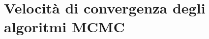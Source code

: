 \documentclass[\main/main.tex]{subfiles}
\begin{document}
\chapter{Velocità di convergenza degli algoritmi MCMC}


\end{document}
